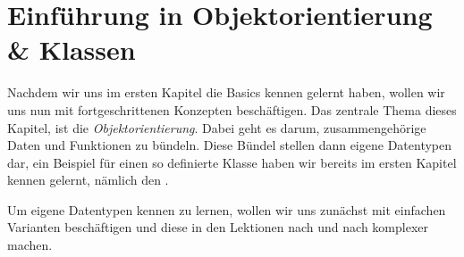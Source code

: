 \chapter[Objektorientierung]{Einführung in Objektorientierung \& Klassen}
\pagestyle{empty}

Nachdem wir uns im ersten Kapitel die Basics kennen gelernt haben, wollen wir uns nun mit fortgeschrittenen Konzepten beschäftigen.
Das zentrale Thema dieses Kapitel, ist die \emph{Objektorientierung}.
Dabei geht es darum, zusammengehörige Daten und Funktionen zu bündeln.
Diese Bündel stellen dann eigene Datentypen dar, ein Beispiel für einen so definierte \glqq{}Klasse\grqq{} haben wir bereits im ersten Kapitel kennen gelernt, nämlich den .

Um eigene Datentypen kennen zu lernen, wollen wir uns zunächst mit einfachen Varianten beschäftigen und diese in den Lektionen nach und nach komplexer machen.

\pagestyle{fancy}

\pagestyle{empty}
